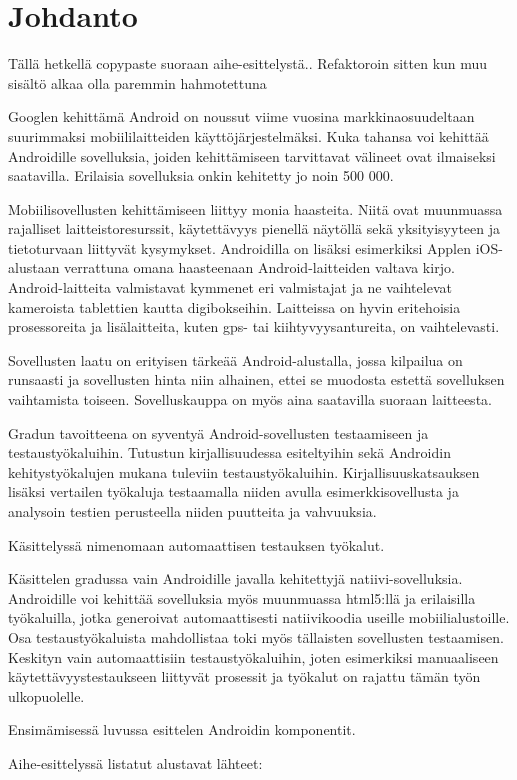 \section{Johdanto}

Tällä hetkellä copypaste suoraan aihe-esittelystä.. Refaktoroin sitten kun muu sisältö alkaa olla paremmin hahmotettuna

Googlen kehittämä Android on noussut viime vuosina markkinaosuudeltaan suurimmaksi mobiililaitteiden käyttöjärjestelmäksi. Kuka tahansa voi kehittää Androidille sovelluksia, joiden kehittämiseen tarvittavat välineet ovat ilmaiseksi saatavilla. Erilaisia sovelluksia onkin kehitetty jo noin 500 000.

Mobiilisovellusten kehittämiseen liittyy monia haasteita. Niitä ovat muunmuassa rajalliset laitteistoresurssit, käytettävyys pienellä näytöllä sekä yksityisyyteen ja tietoturvaan liittyvät kysymykset. Androidilla on lisäksi esimerkiksi Applen iOS-alustaan verrattuna omana haasteenaan Android-laitteiden valtava kirjo. Android-laitteita valmistavat kymmenet eri valmistajat ja ne vaihtelevat kameroista tablettien kautta digibokseihin. Laitteissa on hyvin eritehoisia prosessoreita ja lisälaitteita, kuten gps- tai kiihtyvyysantureita, on vaihtelevasti.

Sovellusten laatu on erityisen tärkeää Android-alustalla, jossa kilpailua on runsaasti ja sovellusten hinta niin alhainen, ettei se muodosta estettä sovelluksen vaihtamista toiseen. Sovelluskauppa on myös aina saatavilla suoraan laitteesta.

Gradun tavoitteena on syventyä Android-sovellusten testaamiseen ja testaustyökaluihin. Tutustun kirjallisuudessa esiteltyihin sekä Androidin kehitystyökalujen mukana tuleviin testaustyökaluihin. Kirjallisuuskatsauksen lisäksi vertailen työkaluja testaamalla niiden avulla esimerkkisovellusta ja analysoin testien perusteella niiden puutteita ja vahvuuksia.

Käsittelyssä nimenomaan automaattisen testauksen työkalut.

Käsittelen gradussa vain Androidille javalla kehitettyjä natiivi-sovelluksia. Androidille voi kehittää sovelluksia myös muunmuassa html5:llä ja erilaisilla työkaluilla, jotka generoivat automaattisesti natiivikoodia useille mobiilialustoille. Osa testaustyökaluista mahdollistaa toki myös tällaisten sovellusten testaamisen. Keskityn vain automaattisiin testaustyökaluihin, joten esimerkiksi manuaaliseen käytettävyystestaukseen liittyvät prosessit ja työkalut on rajattu tämän työn ulkopuolelle.

Ensimämisessä luvussa esittelen Androidin komponentit.

Aihe-esittelyssä listatut alustavat lähteet: 
\cite{hyungkeunetal11}
\cite{kropp10}
\cite{mirzaeietal12}
\cite{wasserman10}
\cite{hampark11}
